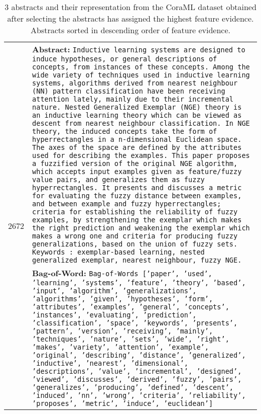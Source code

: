 \begin{table}[!h]
{\begin{tabular}{p{1cm} p{12cm}}
             \multirow{2}{*}{2672}  & \textbf{Abstract:} {\tt Inductive learning systems are designed to induce hypotheses, or general descriptions of concepts, from instances of these concepts. Among the wide variety of techniques used in inductive learning systems, algorithms derived from nearest neighbour (NN) pattern classification have been receiving attention lately, mainly due to their incremental nature. Nested Generalized Exemplar (NGE) theory is an inductive learning theory which can be viewed as descent from nearest neighbour classification. In NGE theory, the induced concepts take the form of hyperrectangles in a n-dimensional Euclidean space. The axes of the space are defined by the attributes used for describing the examples. This paper proposes a fuzzified version of the original NGE algorithm, which accepts input examples given as feature/fuzzy value pairs, and generalizes them as fuzzy hyperrectangles. It presents and discusses a metric for evaluating the fuzzy distance between examples, and between example and fuzzy hyperrectangles; criteria for establishing the reliability of fuzzy examples, by strengthening the exemplar which makes the right prediction and weakening the exemplar which makes a wrong one and criteria for producing fuzzy generalizations, based on the union of fuzzy sets. Keywords : exemplar-based learning, nested generalized exemplar, nearest neighbour, fuzzy NGE.} \\
             & \textbf{Bag-of-Word:} {\tt Bag-of-Words ['paper', 'used', 'learning', 'systems', 'feature', 'theory', 'based', 'input', 'algorithm', 'generalizations', 'algorithms', 'given', 'hypotheses', 'form', 'attributes', 'examples', 'general', 'concepts', 'instances', 'evaluating', 'prediction', 'classification', 'space', 'keywords', 'presents', 'pattern', 'version', 'receiving', 'mainly', 'techniques', 'nature', 'sets', 'wide', 'right', 'makes', 'variety', 'attention', 'example', 'original', 'describing', 'distance', 'generalized', 'inductive', 'nearest', 'dimensional', 'descriptions', 'value', 'incremental', 'designed', 'viewed', 'discusses', 'derived', 'fuzzy', 'pairs', 'generalizes', 'producing', 'defined', 'descent', 'induced', 'nn', 'wrong', 'criteria', 'reliability', 'proposes', 'metric', 'induce', 'euclidean']} \\
             \bottomrule
        \end{tabular}
    }
    \vspace{5mm}
    \caption{3 abstracts and their representation from the CoraML dataset obtained after selecting the abstracts \oursacro{} has assigned the highest feature evidence. Abstracts sorted in descending order of feature evidence.}
    \label{tab:highest_evidence_abstracts}
\end{table}


